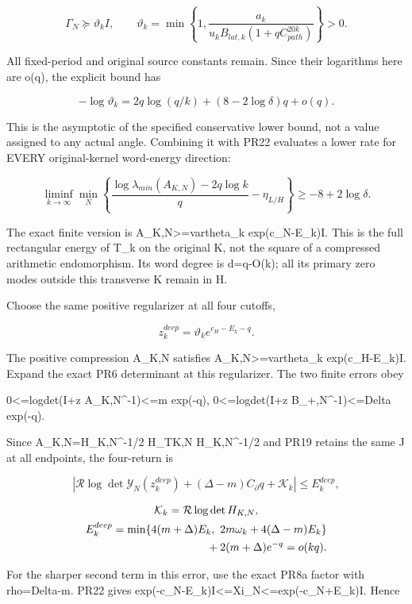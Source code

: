 \documentclass[11pt]{article}
\begin{document}
\[
\boxed{
\Gamma_N\succeq\vartheta_k I,\qquad
\vartheta_k=\min\left\{1,
\frac{a_k}{u_kB_{lat,k}(1+qC_{path}^{20k})}\right\}>0.
}
\tag{PR29}
\]

All fixed-period and original source constants remain. Since their logarithms here are o(q), the explicit bound has

\[
-\log\vartheta_k
=2q\log(q/k)+(8-2\log\delta)q+o(q).
\tag{PR29b}
\]

This is the asymptotic of the specified conservative lower bound, not a value assigned to any actual angle. Combining it with PR22 evaluates a lower rate for EVERY original-kernel word-energy direction:

\[
\boxed{
\liminf_{k\to\infty}\min_N
\left\{\frac{\log\lambda_{min}(A_{K,N})-2q\log k}{q}
-\eta_{L/H}\right\}\ge-8+2\log\delta.
}
\tag{PR29c}
\]

The exact finite version is A\_K,N\textgreater=vartheta\_k exp(c\_N-E\_k)I. This is the full rectangular energy of T\_k on the original K, not the square of a compressed arithmetic endomorphism. Its word degree is d=q-O(k); all its primary zero modes outside this transverse K remain in H.

Choose the same positive regularizer at all four cutoffs,

\[
z_k^{deep}=\vartheta_k e^{c_H-E_k-q}.
\]

The positive compression A\_K,N satisfies A\_K,N\textgreater=vartheta\_k exp(c\_H-E\_k)I. Expand the exact PR6 determinant at this regularizer. The two finite errors obey

0\textless=logdet(I+z A\_K,N\^{}-1)\textless=m exp(-q), 0\textless=logdet(I+z B\_+,N\^{}-1)\textless=Delta exp(-q).

Since A\_K,N=H\_K,N\^{}-1/2 H\_TK,N H\_K,N\^{}-1/2 and PR19 retains the same J at all endpoints, the four-return is

\[
\boxed{
\left|\mathcal R\log\det\mathscr Y_N(z_k^{deep})
+(\Delta-m)C_\partial q+\mathcal K_k\right|
\le E_k^{deep},
}
\tag{PR30}
\]

\[
\begin{gathered}
\mathcal K_k=\mathcal R\log\det H_{K,N},\\
E_k^{deep}=\min\{4(m+\Delta)E_k,\ 2m\omega_k+4(\Delta-m)E_k\}\\
\hfill{}+2(m+\Delta)e^{-q}=o(kq).
\end{gathered}
\]

For the sharper second term in this error, use the exact PR8a factor with rho=Delta-m. PR22 gives exp(-c\_N-E\_k)I\textless=Xi\_N\textless=exp(-c\_N+E\_k)I. Hence
\end{document}

